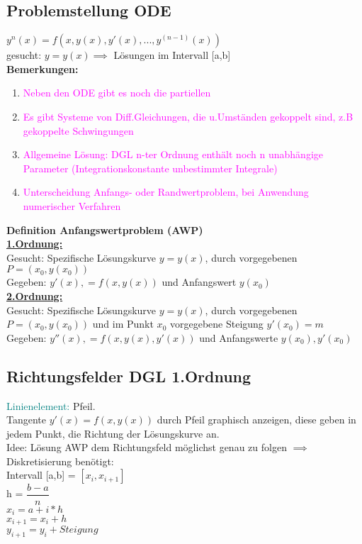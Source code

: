 \documentclass[../ZF_HM2.tex]{subfiles}
\begin{document}
\subsection{Problemstellung ODE}

\colorbox{blue!30}{$y^n(x)=$}$f(x,y(x),y'(x),...,y^{(n-1)}(x))$\\
\colorbox{blue!30}{gesucht:} $y=y(x) \implies$ Lösungen im Intervall [a,b]\\
\textbf{\colorbox{magenta!30}{Bemerkungen:}}\\
\begin{enumerate}
	\item \textcolor{magenta}{Neben den ODE gibt es noch die partiellen}
	\item \textcolor{magenta}{Es gibt Systeme von Diff.Gleichungen, die u.Umständen gekoppelt sind, z.B gekoppelte Schwingungen}
	\item \textcolor{magenta}{Allgemeine Lösung: DGL n-ter Ordnung enthält noch n unabhängige Parameter (Integrationskonstante unbestimmter Integrale)}
	\item 
	\textcolor{magenta}{Unterscheidung Anfangs- oder Randwertproblem, bei Anwendung numerischer Verfahren}
\end{enumerate}

\textbf{\colorbox{violet!30}{Definition Anfangswertproblem (AWP)}}\\
\textbf{\underline{1.Ordnung:}}\\
\colorbox{pink!30}{Gesucht:} Spezifische Lösungskurve $y=y(x)$, durch vorgegebenen $P=(x_0,y(x_0))$\\
\colorbox{green!30}{Gegeben:} $y'(x), = f(x,y(x))$ und Anfangswert $y(x_0)$\\
\textbf{\underline{2.Ordnung:}}\\
\colorbox{pink!30}{Gesucht:} Spezifische Lösungskurve $y=y(x)$, durch vorgegebenen $P=(x_0,y(x_0))$ und im Punkt $x_0$ vorgegebene Steigung $y'(x_0)=m$\\
\colorbox{green!30}{Gegeben:} $y''(x), = f(x,y(x),y'(x))$ und Anfangswerte $y(x_0),y'(x_0)$\\

\subsection{Richtungsfelder DGL 1.Ordnung}

\textcolor{teal}{Linienelement:} Pfeil.\\
Tangente $y'(x) = f(x,y(x))$ durch Pfeil graphisch anzeigen, diese geben in jedem Punkt, die Richtung der Lösungskurve an.\\
Idee: Lösung AWP dem Richtungsfeld möglichst genau zu folgen $\implies$ Diskretisierung benötigt:\\
Intervall [a,b] = $[x_i,x_{i+1}]$\\
h = $\dfrac{b-a}{n}$\\
$x_i = a+i*h$\\
$x_{i+1}= x_i + h$\\
$y_{i+1} = y_i + Steigung$
\end{document}
